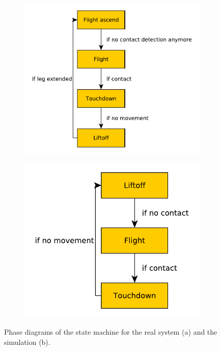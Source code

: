 \documentclass[onecolumn, letter paper]{report}
\begin{document}
\begin{figure}[htb!]
    \centering
    \begin{subfigure}[b]{.49 \textwidth}
    \includegraphics[width=\textwidth]{figures/phase_diagram_real_system.pdf}
    \end{subfigure}
    \begin{subfigure}[b]{.49 \textwidth}
    \includegraphics[width=.7\textwidth]{figures/phase_diagram_simulation.pdf}
    \vspace{1cm}
    \end{subfigure}
    \caption{Phase diagrams of the state machine for the real system (a) and the simulation (b). }
    \label{fig:state}
\end{figure}
\end{document}
